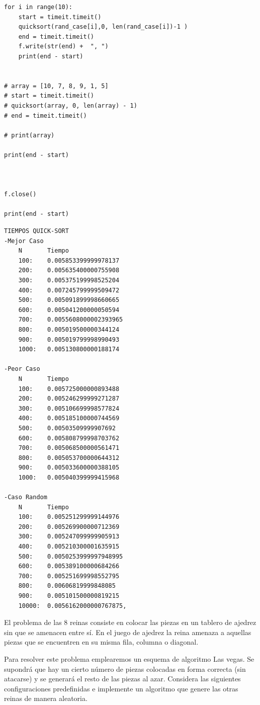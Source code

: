 \documentclass[runningheads,a4paper]{llncs}
\begin{document}
\begin{lstlisting}
for i in range(10):
    start = timeit.timeit()
    quicksort(rand_case[i],0, len(rand_case[i])-1 )
    end = timeit.timeit()
    f.write(str(end) +  ", ")
    print(end - start)


# array = [10, 7, 8, 9, 1, 5] 
# start = timeit.timeit()
# quicksort(array, 0, len(array) - 1)
# end = timeit.timeit()

# print(array) 

print(end - start)



f.close()

print(end - start)
\end{lstlisting}

\begin{lstlisting}
TIEMPOS QUICK-SORT
-Mejor Caso
	N		Tiempo
	100:	0.005853399999978137
	200: 	0.005635400000755908
	300:	0.005375199998525204
	400:	0.007245799999509472
	500:	0.005091899998660665
	600:	0.005041200000050594
	700:	0.0055608000002393965
	800:	0.005019500000344124
	900:	0.005019799998990493
	1000:	0.005130800000188174

-Peor Caso
	N		Tiempo
	100:	0.005725000000893488
	200:	0.005246299999271287
	300:	0.005106699998577824
	400:	0.005185100000744569
	500:	0.00503509999907692
	600:	0.005808799998703762
	700:	0.005068500000561471
	800:	0.005053700000644312
	900: 	0.005033600000388105
	1000:	0.005040399999415968
	
-Caso Random
	N		Tiempo
	100:	0.005251299999144976
	200:	0.005269900000712369
	300: 	0.005247099999905913 
	400:	0.005210300001635915
	500:	0.0050253999997948995
	600:	0.005389100000684266
	700:	0.005251699998552795
	800:	0.00606819999848085
	900: 	0.005101500000819215
	10000:	0.0056162000000767875,  
\end{lstlisting}

El problema de las 8 reinas consiste en colocar las piezas en un tablero de ajedrez sin que se amenacen entre s\'i. En el juego de ajedrez la reina amenaza a aquellas piezas que se encuentren en su misma fila, columna o diagonal. 

Para resolver este problema emplearemos un esquema de algoritmo Las vegas. Se supondr\'a que hay un cierto n\'umero de piezas colocadas en forma correcta (sin atacarse) y se generar\'a el resto de las piezas al azar.
Considera las siguientes configuraciones predefinidas e implemente un algoritmo que genere las otras reinas de manera aleatoria.
\end{document}
